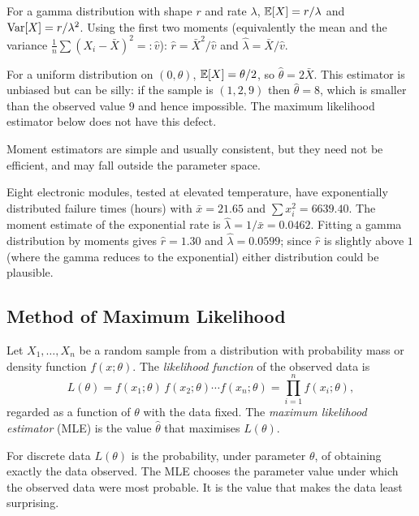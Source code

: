 \begin{example}[Gamma]
For a gamma distribution with shape $r$ and rate $\lambda$, $\mathbb{E}[X]=r/\lambda$ and $\operatorname{Var}[X]=r/\lambda^2$. Using the first two moments (equivalently the mean and the variance $\frac1n\sum(X_i-\bar{X})^2=:\hat v$): $\hat r=\bar{X}^2/\hat v$ and $\hat\lambda=\bar{X}/\hat v$.
\end{example}

\begin{example}[Uniform]
For a uniform distribution on $(0,\theta)$, $\mathbb{E}[X]=\theta/2$, so $\hat\theta=2\bar{X}$. This estimator is unbiased but can be silly: if the sample is $(1,2,9)$ then $\hat\theta=8$, which is smaller than the observed value $9$ and hence impossible. The maximum likelihood estimator below does not have this defect.
\end{example}

Moment estimators are simple and usually consistent, but they need not be efficient, and may fall outside the parameter space.

\begin{example}
Eight electronic modules, tested at elevated temperature, have exponentially distributed failure times (hours) with $\bar{x}=21.65$ and $\sum x_i^2=6639.40$. The moment estimate of the exponential rate is $\hat\lambda=1/\bar{x}=0.0462$. Fitting a gamma distribution by moments gives $\hat{r}=1.30$ and $\hat\lambda=0.0599$; since $\hat{r}$ is slightly above $1$ (where the gamma reduces to the exponential) either distribution could be plausible.
\end{example}

\subsection{Method of Maximum Likelihood}

\begin{definition}
Let $X_1,\dots,X_n$ be a random sample from a distribution with probability mass or density function $f(x;\theta)$. The \emph{likelihood function} of the observed data is
\[ L(\theta)=f(x_1;\theta)\,f(x_2;\theta)\cdots f(x_n;\theta)=\prod_{i=1}^nf(x_i;\theta), \]
regarded as a function of $\theta$ with the data fixed. The \emph{maximum likelihood estimator} (MLE) is the value $\hat\theta$ that maximises $L(\theta)$.
\end{definition}

\begin{intuition}
For discrete data $L(\theta)$ is the probability, under parameter $\theta$, of obtaining exactly the data observed. The MLE chooses the parameter value under which the observed data were most probable. It is the value that makes the data least surprising.
\end{intuition}

